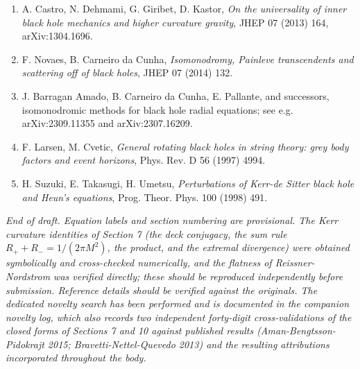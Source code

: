 \documentclass[11pt]{article}
\begin{document}
\begin{enumerate}
\item A. Castro, N. Dehmami, G. Giribet, D. Kastor, \emph{On the universality of inner black hole mechanics and higher curvature gravity}, JHEP 07 (2013) 164, arXiv:1304.1696.
\item F. Novaes, B. Carneiro da Cunha, \emph{Isomonodromy, Painleve transcendents and scattering off of black holes}, JHEP 07 (2014) 132.
\item J. Barragan Amado, B. Carneiro da Cunha, E. Pallante, and successors, isomonodromic methods for black hole radial equations; see e.g. arXiv:2309.11355 and arXiv:2307.16209.
\item F. Larsen, M. Cvetic, \emph{General rotating black holes in string theory: grey body factors and event horizons}, Phys. Rev. D 56 (1997) 4994.
\item H. Suzuki, E. Takasugi, H. Umetsu, \emph{Perturbations of Kerr-de Sitter black hole and Heun's equations}, Prog. Theor. Phys. 100 (1998) 491.
\end{enumerate}



\emph{End of draft. Equation labels and section numbering are provisional. The Kerr curvature identities of Section 7 (the deck conjugacy, the sum rule $R_+ + R_- = 1/(2\pi M^2)$, the product, and the extremal divergence) were obtained symbolically and cross-checked numerically, and the flatness of Reissner-Nordstrom was verified directly; these should be reproduced independently before submission. Reference details should be verified against the originals. The dedicated novelty search has been performed and is documented in the companion novelty log, which also records two independent forty-digit cross-validations of the closed forms of Sections 7 and 10 against published results (Aman-Bengtsson-Pidokrajt 2015; Bravetti-Nettel-Quevedo 2013) and the resulting attributions incorporated throughout the body.}
\end{document}
